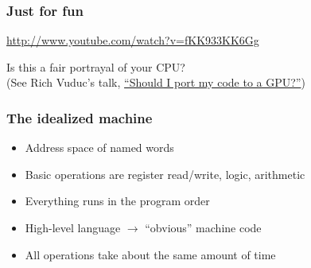 \documentclass{beamer}
\begin{document}
\begin{frame}
  \titlepage
\end{frame}


\begin{frame}
  \frametitle{Just for fun}
  
  \begin{center}
  \url{http://www.youtube.com/watch?v=fKK933KK6Gg}
  \end{center}

  \begin{center}
    Is this a fair portrayal of your CPU? \\[5mm]
    (See Rich Vuduc's talk, 
    \href{http://web.eecs.utk.edu/~dongarra/ccgsc2010/slides/talk27-vuduc.pdf}
         {``Should I port my code to a GPU?''})
  \end{center}
\end{frame}

\begin{frame}
  \frametitle{The idealized machine}
  
  \begin{center}
  \end{center}

  \begin{itemize}
  \item Address space of named words
  \item Basic operations are register read/write, logic, arithmetic
  \item Everything runs in the program order
  \item High-level language $\rightarrow$ ``obvious'' machine code
  \item All operations take about the same amount of time
  \end{itemize}
\end{frame}
\end{document}
